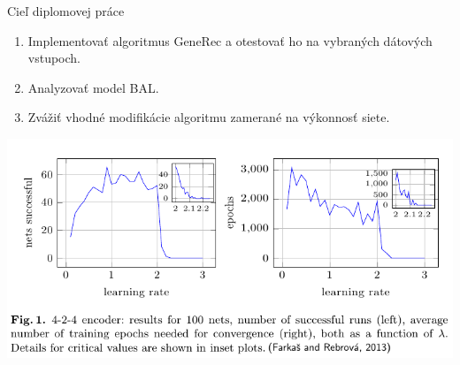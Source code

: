 \documentclass[xcolor=dvipsnames]{beamer}
\begin{document}

\begin{frame}{Cieľ diplomovej práce} 
  \begin{enumerate} 
    \item Implementovať algoritmus GeneRec a otestovať ho na vybraných dátových vstupoch. 
    \item Analyzovať model BAL. 
    \item Zvážiť vhodné modifikácie algoritmu zamerané na výkonnosť siete. 
  \end{enumerate} 
  
  \begin{center}
    \includegraphics[scale=0.40]{img/bal_performance.png}
  \end{center}  
  
\end{frame} 

\end{document}
